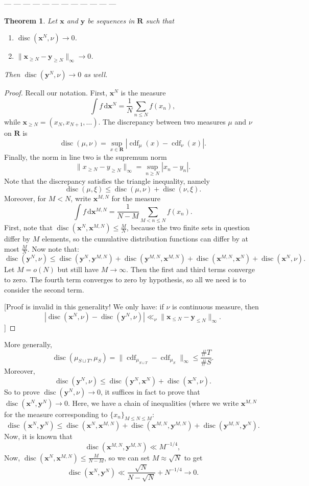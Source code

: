 \documentclass{article}
\DeclareMathOperator{\cdf}{cdf}
\DeclareMathOperator{\disc}{disc}
\newcommand{\bR}{\mathbf{R}}
\newcommand{\bx}{{\boldsymbol x}}
\newcommand{\by}{{\boldsymbol y}}
\newcommand{\dd}{\mathrm{d}}
\newtheorem{theorem}{Theorem}
\begin{document}
--- --- --- --- --- --- --- --- --- --- --- --- 

\begin{theorem}
Let $\bx$ and $\by$ be sequences in $\bR$ such that 
\begin{enumerate}
\item
$\disc(\bx^N,\nu) \to 0$. 
\item
$\|\bx_{\geqslant N} - \by_{\geqslant N}\|_\infty \to 0$. 
\end{enumerate}
Then $\disc(\by^N, \nu) \to 0$ as well. 
\end{theorem}
\begin{proof}
Recall our notation. First, $\bx^N$ is the measure 
\[
	\int f\, \dd\bx^N = \frac{1}{N} \sum_{n\leqslant N} f(x_n) ,
\]
while $\bx_{\geqslant N} = (x_N, x_{N+1}, \dots)$. The discrepancy between 
two measures $\mu$ and $\nu$ on $\bR$ is 
\[
	\disc(\mu,\nu) = \sup_{x\in \bR} |\cdf_{\mu}(x) - \cdf_\nu(x)| .
\]
Finally, the norm in line two is the supremum norm 
\[
	\| x_{\geqslant N} - y_{\geqslant N} \|_\infty = \sup_{n\geqslant N} |x_n - y_n| .
\]
Note that the discrepancy satisfies the triangle inequality, namely 
\[
	\disc(\mu,\xi) \leqslant \disc(\mu,\nu) + \disc(\nu,\xi) .
\]
Moreover, for $M < N$, write $\bx^{M,N}$ for the measure 
\[
	\int f\, \dd\bx^{M,N} = \frac{1}{N - M} \sum_{M < n \leqslant N} f(x_n) .
\]
First, note that $\disc(\bx^N,\bx^{M,N}) \leqslant \frac M N$, because the 
two finite sets in question differ by $M$ elements, so the cumulative 
distribution functions can differ by at most $\frac M N$. Now note that:
\[
	\disc(\by^N, \nu) 
		\leqslant \disc(\by^N, \by^{M,N}) + \disc(\by^{M,N}, \bx^{M,N}) + \disc(\bx^{M,N}, \bx^N) + \disc(\bx^N,\nu) .
\]
Let $M=o(N)$ but still have $M\to \infty$. Then the first and third terms 
converge to zero. The fourth term converges to zero by hypothesis, so all 
we need is to consider the second term. 

[Proof is invalid in this generality! We only have: if $\nu$ is continuous 
measure, then 
\[
	|\disc(\bx^N, \nu) - \disc(\by^N,\nu)| \ll_\nu \| \bx_{\leqslant N} - \by_{\leqslant N}\|_ \infty .
\]]
\end{proof}

More generally, 
\[
	\disc(\mu_{S\sqcup T}, \mu_S) = \|\cdf_{\mu_{S\sqcup T}} - \cdf_{\mu_S}\|_\infty \leqslant \frac{\# T}{\# S} .
\]
Moreover,  
\[
	\disc(\by^N,\nu) \leqslant \disc(\by^N, \bx^N) + \disc(\bx^N, \nu) .
\]
So to prove $\disc(\by^N,\nu)\to 0$, it suffices in fact to prove that 
$\disc(\bx^N,\by^N) \to 0$. Here, we have a chain of inequalities (where 
we write $\bx^{M,N}$ for the measure corresponding to 
$\{x_n\}_{M\leqslant N \leqslant M}$: 
\[
	\disc(\bx^N,\by^N) \leqslant \disc(\bx^N,\bx^{M,N}) + \disc(\bx^{M,N},\by^{M,N}) + \disc(\by^{M,N},\by^N) .
\]
Now, it is known that 
\[
	\disc(\bx^{M,N},\by^{M,N}) \ll M^{-1/4} ,
\]
Now, $\disc(\bx^N, \bx^{M,N}) \leqslant \frac{M}{N - M}$, so we can set 
$M\approx \sqrt N$ to get 
\[
	\disc(\bx^N, \by^N) \ll \frac{\sqrt N}{N - \sqrt N} + N^{-1/4} \to 0 .
\]
\end{document}
